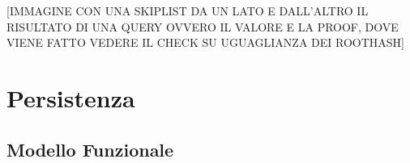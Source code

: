 		[IMMAGINE CON UNA SKIPLIST DA UN LATO E DALL'ALTRO IL RISULTATO DI UNA QUERY OVVERO IL VALORE E LA PROOF, DOVE VIENE FATTO VEDERE IL CHECK SU UGUAGLIANZA DEI ROOTHASH]
	
\section{Persistenza}


	\subsection{Modello Funzionale}
	
